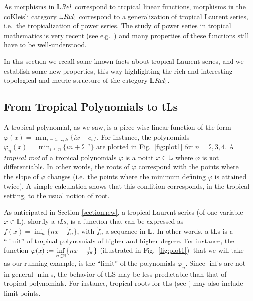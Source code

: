 
As morphisms in $\LREL$ correspond to tropical linear functions, morphisms in the coKleisli category $\LREL_{!}$ 
correspond to a generalization of tropical Laurent series, i.e.~the tropicalization of power series. 
The study of power series in tropical mathematics is very recent (see e.g.~\cite{Porzio2021}) and many properties of these functions still have to be well-understood. 

In this section we recall some known facts about tropical Laurent series, and we establish some new properties, this way highlighting the rich and interesting topological and metric structure of the category $\LREL_{!}$.

%

\subsection{From Tropical Polynomials to tLs}

A tropical polynomial, as we saw, is a piece-wise linear function of the form $\varphi(x)=\min_{i=1,\dots,k}\{ix+c_{i}\}$. For instance, the polynomials $\varphi_{n}(x)=\min_{i\leq n}\{in+2^{-i}\}$
are plotted in Fig.~\ref{fig:plot1} for $n=2,3,4$.
A \emph{tropical root} of a tropical polynomials $\varphi$ is a point $x\in \mathbb{L}$ where $\varphi$ is not differentiable. In other words, the roots of $\varphi$ correspond with the points where the slope of $\varphi$ changes (i.e.~the points where the minimum defining $\varphi$ is attained twice). A simple calculation shows that this condition corresponds, in the tropical setting, to the usual notion of root. 



As anticipated in Section \ref{sectionnew}, a tropical Laurent series (of one variable $x\in\mathbb{L}$), shortly a \emph{tLs}, is a function that can be expressed as $f(x)=\inf_{n}\{nx+\check f_{n}\}$, with $\check  f_{n}$ a sequence in $\mathbb{L}$. In other words, a tLs is a ``limit'' of tropical polynomials of higher and higher degree. For instance, the function $\varphi(x):=\inf\limits_{n\in\mathbb{N}}\{nx+\frac{1}{2^n}\}$ (illustrated in Fig.~\ref{fig:plot1}), that we will take as our running example, 
is the ``limit'' of the polynomials $\varphi_{n}$. Since $\inf$s are not in general $\min$s, the behavior of tLS may be less predictable than that of tropical polynomials. For instance, tropical roots for tLs (see \cite{Porzio2021}) may also include limit points.


